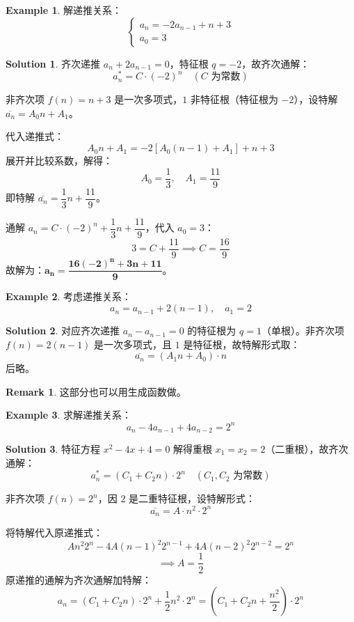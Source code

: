 \documentclass[oneside]{book}
\theoremstyle{definition}
\newtheorem{example}{Example}[section]
\newtheorem{remark}{Remark}[section]
\newtheorem*{sol}{Solution}
\begin{document}
\begin{example}
	解递推关系：  
	\[
	\begin{cases} 
		a_n = -2a_{n-1} + n + 3 \\ 
		a_0 = 3 
	\end{cases}
	\]  
\end{example}

	\begin{sol}
	齐次递推 \( a_n + 2a_{n-1} = 0 \)，特征根 \( q=-2 \)，故齐次通解：  
	\[
	a_n^* = C \cdot (-2)^n \quad (C \text{ 为常数})
	\]  
	
	非齐次项 \( f(n)=n+3 \) 是一次多项式，\( 1 \) 非特征根（特征根为 \( -2 \)），设特解 \( \overline{a_n} = A_0 n + A_1 \)。  
	
	代入递推式：  
	\[
	A_0 n + A_1 = -2\left[ A_0 (n-1) + A_1 \right] + n + 3
	\]  
	展开并比较系数，解得：  
	\[
	A_0 = \dfrac{1}{3},\quad A_1 = \dfrac{11}{9}
	\]  
	即特解 \( \overline{a_n} = \dfrac{1}{3}n + \dfrac{11}{9} \)。  
	
	通解 \( a_n = C \cdot (-2)^n + \dfrac{1}{3}n + \dfrac{11}{9} \)，代入 \( a_0=3 \)：  
	\[
	3 = C + \dfrac{11}{9} \implies C = \dfrac{16}{9}
	\]  
	故解为：\( \boldsymbol{a_n = \dfrac{16(-2)^n + 3n + 11}{9}} \)。
	\end{sol}    
  
  \begin{example}
  	考虑递推关系：  
  	\[
  	a_n = a_{n-1} + 2(n-1), \quad a_1 = 2
  	\]  
  \end{example}  
  
  \begin{sol}
  		对应齐次递推 \( a_n - a_{n-1} = 0 \) 的特征根为 \( q=1 \)（单根）。非齐次项 \( f(n) = 2(n-1) \) 是一次多项式，且 \( 1 \) 是特征根，故特解形式取：  
  	\[
  	\overline{a_n} = (A_1 n + A_0) \cdot n 
  	\]  
后略。  
  \end{sol}
\begin{remark}
	这部分也可以用生成函数做。
\end{remark}
  
  
  \begin{example}  
  	求解递推关系：  
  	\[
  	a_n - 4a_{n-1} + 4a_{n-2} = 2^n
  	\]  
  	  \end{example}  
  \begin{sol}
  	特征方程 \( x^2 - 4x + 4 = 0 \) 解得重根 \( x_1 = x_2 = 2 \)（二重根），故齐次通解：  
  	\[
  	a_n^* = (C_1 + C_2 n) \cdot 2^n \quad (C_1, C_2 \text{ 为常数})
  	\]  

  	非齐次项 \( f(n) = 2^n \)，因 \( 2 \) 是二重特征根，设特解形式：  
  	\[
  	\overline{a_n} = A \cdot n^2 \cdot 2^n \tag{指数项乘以 \( n^m \)，其中 \( m=2 \) 是根的重数}
  	\]  
  	
  	将特解代入原递推式：  
  	\[
  	A n^2 2^n - 4A (n-1)^2 2^{n-1} + 4A (n-2)^2 2^{n-2} = 2^n
  	\]  
  	\[
  	\implies A = \dfrac{1}{2}
  	\]  
  	原递推的通解为齐次通解加特解：  
  	\[
  	a_n = (C_1 + C_2 n) \cdot 2^n + \dfrac{1}{2} n^2 \cdot 2^n = \left( C_1 + C_2 n + \dfrac{n^2}{2} \right) \cdot 2^n
  	\]  

  
  \end{sol}
  
\end{document}
